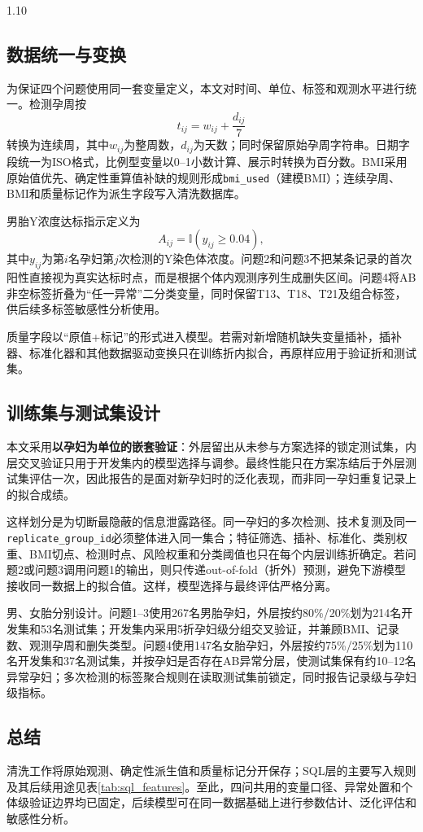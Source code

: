 \documentclass[12pt,a4paper]{ctexrep}
\numberwithin{equation}{section}
\begin{document}
\begin{spacing}{1.10}
{			\subsection{数据统一与变换}
			为保证四个问题使用同一套变量定义，本文对时间、单位、标签和观测水平进行统一。检测孕周按
			\[
			t_{ij}=w_{ij}+\frac{d_{ij}}{7}
			\]
			转换为连续周，其中$w_{ij}$为整周数，$d_{ij}$为天数；同时保留原始孕周字符串。日期字段统一为ISO格式，比例型变量以0--1小数计算、展示时转换为百分数。BMI采用原始值优先、确定性重算值补缺的规则形成\texttt{bmi\_used}（建模BMI）；连续孕周、BMI和质量标记作为派生字段写入清洗数据库。

			男胎Y浓度达标指示定义为
			\[
			A_{ij}=\mathbb{I}(y_{ij}\geq0.04),
			\]
			其中$y_{ij}$为第$i$名孕妇第$j$次检测的Y染色体浓度。问题2和问题3不把某条记录的首次阳性直接视为真实达标时点，而是根据个体内观测序列生成删失区间。问题4将AB非空标签折叠为“任一异常”二分类变量，同时保留T13、T18、T21及组合标签，供后续多标签敏感性分析使用。

			质量字段以“原值+标记”的形式进入模型。若需对新增随机缺失变量插补，插补器、标准化器和其他数据驱动变换只在训练折内拟合，再原样应用于验证折和测试集。

			\subsection{训练集与测试集设计}
			本文采用{\heiti\bfseries 以孕妇为单位的嵌套验证}：外层留出从未参与方案选择的锁定测试集，内层交叉验证只用于开发集内的模型选择与调参。最终性能只在方案冻结后于外层测试集评估一次，因此报告的是面对新孕妇时的泛化表现，而非同一孕妇重复记录上的拟合成绩。

			这样划分是为切断最隐蔽的信息泄露路径。同一孕妇的多次检测、技术复测及同一\texttt{replicate\_group\_id}必须整体进入同一集合；特征筛选、插补、标准化、类别权重、BMI切点、检测时点、风险权重和分类阈值也只在每个内层训练折确定。若问题2或问题3调用问题1的输出，则只传递out-of-fold（折外）预测，避免下游模型接收同一数据上的拟合值。这样，模型选择与最终评估严格分离。

			男、女胎分别设计。问题1--3使用267名男胎孕妇，外层按约80\%/20\%划为214名开发集和53名测试集；开发集内采用5折孕妇级分组交叉验证，并兼顾BMI、记录数、观测孕周和删失类型。问题4使用147名女胎孕妇，外层按约75\%/25\%划为110名开发集和37名测试集，并按孕妇是否存在AB异常分层，使测试集保有约10--12名异常孕妇；多次检测的标签聚合规则在读取测试集前锁定，同时报告记录级与孕妇级指标。

			\subsection{总结}
			清洗工作将原始观测、确定性派生值和质量标记分开保存；SQL层的主要写入规则及其后续用途见表\ref{tab:sql_features}。至此，四问共用的变量口径、异常处置和个体级验证边界均已固定，后续模型可在同一数据基础上进行参数估计、泛化评估和敏感性分析。

}
\end{spacing}
\end{document}
